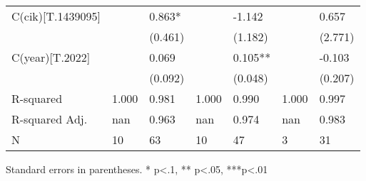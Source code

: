 \begin{table}
\begin{center}
\begin{tabular}{lllllll}
C(cik)[T.1439095] &                 & 0.863*          &                 & -1.142          &                 & 0.657            \\
                  &                 & (0.461)         &                 & (1.182)         &                 & (2.771)          \\
C(year)[T.2022]   &                 & 0.069           &                 & 0.105**         &                 & -0.103           \\
                  &                 & (0.092)         &                 & (0.048)         &                 & (0.207)          \\
R-squared         & 1.000           & 0.981           & 1.000           & 0.990           & 1.000           & 0.997            \\
R-squared Adj.    & nan             & 0.963           & nan             & 0.974           & nan             & 0.983            \\
N                 & 10              & 63              & 10              & 47              & 3               & 31               \\
\hline
\end{tabular}
\end{center}
\end{table}
\bigskip
Standard errors in parentheses. \newline 
* p<.1, ** p<.05, ***p<.01